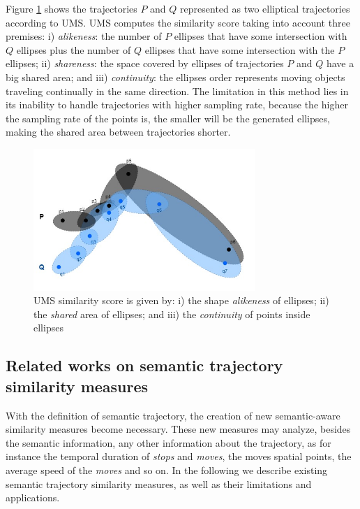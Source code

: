 Figure \ref{fig:related_trajes_UMS} shows the trajectories $P$ and $Q$ represented as two elliptical trajectories according to UMS. UMS computes the similarity score taking into account three premises: i) \textit{alikeness}: {the number of $P$ ellipses that have some intersection with $Q$ ellipses plus the number of $Q$ ellipses that have some intersection with the $P$ ellipses}; ii) \textit{shareness}: the space covered by ellipses of trajectories $P$ and $Q$ have a big shared area; and iii) \textit{continuity}: the ellipses order represents moving objects traveling continually in the same direction. The limitation in this method lies in its inability to handle trajectories with higher sampling rate, because the higher the sampling rate of the points is, the smaller will be the generated ellipses, making the shared area between trajectories shorter.

\begin{figure}[!h]
\centering
\includegraphics[width=0.75\textwidth]{Related_Works/related_trajes-UMS.jpg}
\caption{\label{fig:related_trajes_UMS}UMS similarity score is given by: i) the shape \textit{alikeness} of ellipses; ii) the \textit{shared} area of ellipses; and iii) the \textit{continuity} of points inside ellipses}
\end{figure}

\subsection{Related works on semantic trajectory similarity measures} \label{sec:related_semantic}

With the definition of semantic trajectory, the creation of new semantic-aware similarity measures become necessary. These new measures may analyze, besides the semantic information, any other information about the trajectory, as for instance the temporal duration of \emph{stops} and \emph{moves}, the moves spatial points, the average speed of the \emph{moves} and so on.
In the following we describe existing semantic trajectory similarity measures, as well as their limitations and applications. %

